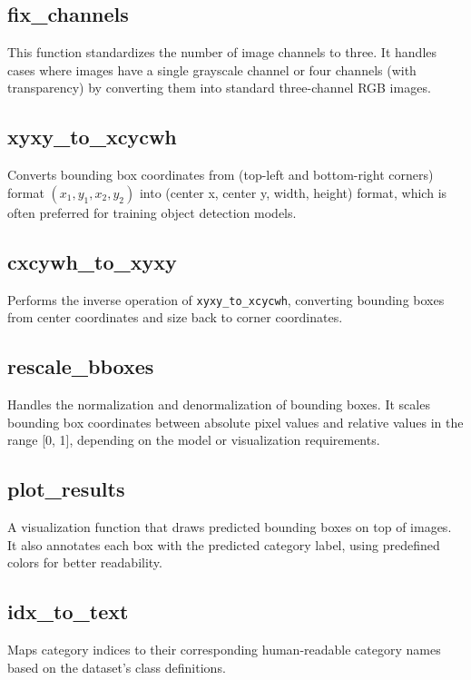 \subsection*{fix\_channels}
This function standardizes the number of image channels to three. It handles cases where images have a single grayscale channel or four channels (with transparency) by converting them into standard three-channel RGB images.

\vspace{-1.25em}
\subsection*{xyxy\_to\_xcycwh}
Converts bounding box coordinates from (top-left and bottom-right corners) format $(x_1, y_1, x_2, y_2)$ into (center x, center y, width, height) format, which is often preferred for training object detection models.

\vspace{-1.25em}
\subsection*{cxcywh\_to\_xyxy}
Performs the inverse operation of \texttt{xyxy\_to\_xcycwh}, converting bounding boxes from center coordinates and size back to corner coordinates.

\vspace{-1.25em}
\subsection*{rescale\_bboxes}
Handles the normalization and denormalization of bounding boxes. It scales bounding box coordinates between absolute pixel values and relative values in the range [0, 1], depending on the model or visualization requirements.

\vspace{-1.25em}
\subsection*{plot\_results}
A visualization function that draws predicted bounding boxes on top of images. It also annotates each box with the predicted category label, using predefined colors for better readability.

\vspace{-1.25em}
\subsection*{idx\_to\_text}
Maps category indices to their corresponding human-readable category names based on the dataset's class definitions.

